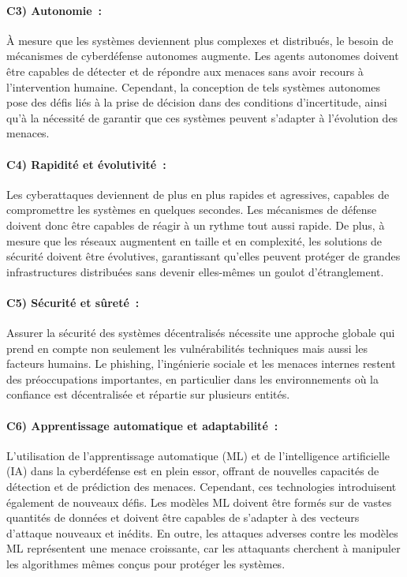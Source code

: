 \paragraph{C3) Autonomie :}
À mesure que les systèmes deviennent plus complexes et distribués, le besoin de mécanismes de cyberdéfense autonomes augmente. Les agents autonomes doivent être capables de détecter et de répondre aux menaces sans avoir recours à l'intervention humaine. Cependant, la conception de tels systèmes autonomes pose des défis liés à la prise de décision dans des conditions d'incertitude, ainsi qu'à la nécessité de garantir que ces systèmes peuvent s'adapter à l'évolution des menaces.

\paragraph{C4) Rapidité et évolutivité :}
Les cyberattaques deviennent de plus en plus rapides et agressives, capables de compromettre les systèmes en quelques secondes. Les mécanismes de défense doivent donc être capables de réagir à un rythme tout aussi rapide. De plus, à mesure que les réseaux augmentent en taille et en complexité, les solutions de sécurité doivent être évolutives, garantissant qu'elles peuvent protéger de grandes infrastructures distribuées sans devenir elles-mêmes un goulot d'étranglement.

\paragraph{C5) Sécurité et sûreté :}
Assurer la sécurité des systèmes décentralisés nécessite une approche globale qui prend en compte non seulement les vulnérabilités techniques mais aussi les facteurs humains. Le phishing, l'ingénierie sociale et les menaces internes restent des préoccupations importantes, en particulier dans les environnements où la confiance est décentralisée et répartie sur plusieurs entités.

\paragraph{C6) Apprentissage automatique et adaptabilité :}
L’utilisation de l’apprentissage automatique (ML) et de l’intelligence artificielle (IA) dans la cyberdéfense est en plein essor, offrant de nouvelles capacités de détection et de prédiction des menaces. Cependant, ces technologies introduisent également de nouveaux défis. Les modèles ML doivent être formés sur de vastes quantités de données et doivent être capables de s’adapter à des vecteurs d’attaque nouveaux et inédits. En outre, les attaques adverses contre les modèles ML représentent une menace croissante, car les attaquants cherchent à manipuler les algorithmes mêmes conçus pour protéger les systèmes.

